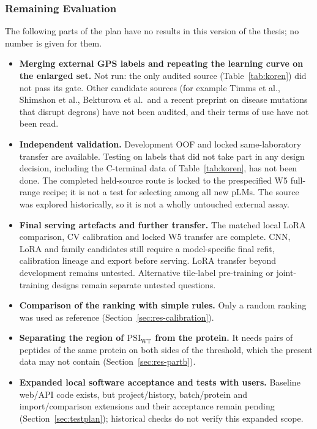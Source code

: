 \subsubsection{Remaining Evaluation}
The following parts of the plan have no results in this version of the thesis; no number is given for them.
\begin{itemize}
  \item \textbf{Merging external GPS labels and repeating the learning curve on the enlarged set.} Not run: the only audited
        source (Table~\ref{tab:koren}) did not pass its gate. Other candidate sources (for example Timms et al., Shimshon et al., Bekturova et al.\ and a recent preprint on disease mutations
        that disrupt degrons) have not been audited, and their terms of use have not been read.
  \item \textbf{Independent validation.} Development OOF and locked same-laboratory transfer are available. Testing on labels that did not take part in any
        design decision, including the C-terminal data of Table~\ref{tab:koren}, has not been done.
        The completed held-source route is locked to the prespecified W5 full-range recipe;
        it is not a test for selecting among all new pLMs. The source was explored historically,
        so it is not a wholly untouched external assay.
  \item \textbf{Final serving artefacts and further transfer.} The matched local LoRA comparison,
        CV calibration and locked W5 transfer are complete. CNN, LoRA and family candidates still
        require a model-specific final refit, calibration lineage and export before serving. LoRA transfer
        beyond development remains untested. Alternative tile-label
        pre-training or joint-training designs remain separate untested questions.
  \item \textbf{Comparison of the ranking with simple rules.} Only a random ranking was used as reference (Section~\ref{sec:res-calibration}).
  \item \textbf{Separating the region of $\mathrm{PSI}_{\mathrm{WT}}$ from the protein.} It needs pairs of peptides of the same protein on both sides
        of the threshold, which the present data may not contain (Section~\ref{sec:res-partb}).
  \item \textbf{Expanded local software acceptance and tests with users.} Baseline web/API code exists,
        but project/history, batch/protein and import/comparison extensions and their acceptance remain
        pending (Section~\ref{sec:testplan}); historical checks do not verify this expanded scope.
\end{itemize}

